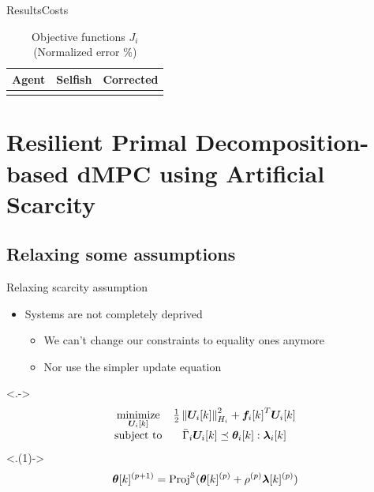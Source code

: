 \documentclass[aspectratio=169]{beamer}
\begin{document}
\begin{frame}{Results}{Costs}
  \begin{table}[h]
    \centering
    \caption*{Objective functions $J_{i}$ (Normalized error \%)}\label{tab:eq_costsGlobalLocal}
    \begin{tabular}[t]{crr}
      \toprule
      Agent  & Selfish & Corrected\\
      \midrule
      \\
      \bottomrule
    \end{tabular}
  \end{table}
  \pause
\end{frame}

\section{Resilient Primal Decomposition-based dMPC using Artificial Scarcity}
\subsection{Relaxing some assumptions}

\begin{frame}{Relaxing scarcity assumption}
  \begin{itemize}[<+(1)->]
    \item Systems are not completely deprived
          \begin{itemize}[<+(1)->]
            \item We can't change our constraints to equality ones anymore
            \item Nor use the simpler update equation
          \end{itemize}
  \end{itemize}

  \centering
  \onslide<.->{
    \begin{equation*}
      \begin{matrix}
        \minimize\limits_{\vec{U}_{i}[k]}&\frac{1}{2}\norm{\vec{U}_{i}[k]}^{2}_{H_{i}} + {\vec{f}_{i}[k]}^{T}\vec{U}_{i}[k]\\
        \mathrm{subject~ to} & \bar{\Gamma}_{i}\vec{U}_{i}[k] \preceq \thetaik:\lambdaik\\
      \end{matrix}
    \end{equation*}
  }
  \onslide<.(1)->{
    \begin{equation*}
      \boldsymbol{\theta}[k]^{(p+1)}=\operatorname{Proj}^{\mathcal{S}}(\boldsymbol{\theta}[k]^{(p)}+\rho^{(p)}\boldsymbol{\lambda}[k]^{(p)})
    \end{equation*}
  }

\end{frame}
\end{document}
